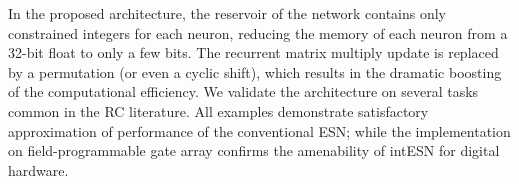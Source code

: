 In the proposed architecture, the reservoir of the network contains only constrained integers for each neuron, reducing the memory of each neuron from a 32-bit float to only a few bits. The recurrent matrix multiply update is replaced by a permutation (or even a cyclic shift), which results in the dramatic boosting of the computational efficiency. We validate the architecture on several tasks common in the RC literature. All examples demonstrate satisfactory approximation of performance of the conventional ESN;
while the implementation on field-programmable gate array confirms the amenability of intESN for digital hardware.














